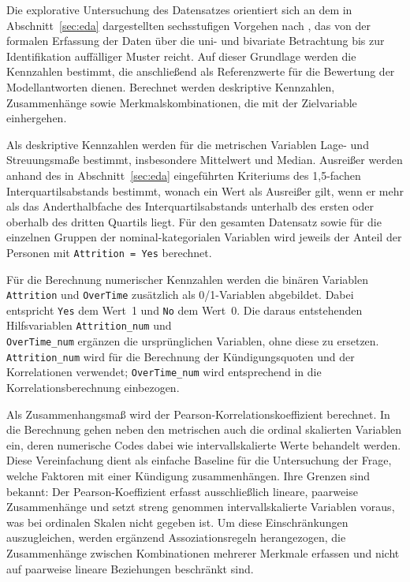 Die explorative Untersuchung des Datensatzes orientiert sich an dem in Abschnitt~\ref{sec:eda} dargestellten sechsstufigen Vorgehen nach \textcite{rahmany_comparing_2020}, das von der formalen Erfassung der Daten über die uni- und bivariate Betrachtung bis zur Identifikation auffälliger Muster reicht. Auf dieser Grundlage werden die Kennzahlen bestimmt, die anschließend als Referenzwerte für die Bewertung der Modellantworten dienen. Berechnet werden deskriptive Kennzahlen, Zusammenhänge sowie Merkmalskombinationen, die mit der Zielvariable einhergehen.

Als deskriptive Kennzahlen werden für die metrischen Variablen Lage- und Streuungsmaße bestimmt, insbesondere Mittelwert und Median. Ausreißer werden anhand des in Abschnitt~\ref{sec:eda} eingeführten Kriteriums des 1,5-fachen Interquartilsabstands bestimmt, wonach ein Wert als Ausreißer gilt, wenn er mehr als das Anderthalbfache des Interquartilsabstands unterhalb des ersten oder oberhalb des dritten Quartils liegt. Für den gesamten Datensatz sowie für die einzelnen Gruppen der nominal-kategorialen Variablen wird jeweils der Anteil der Personen mit \texttt{Attrition = Yes} berechnet.

Für die Berechnung numerischer Kennzahlen werden die binären Variablen \texttt{Attrition} und \texttt{OverTime} zusätzlich als 0/1-Variablen abgebildet. Dabei entspricht \texttt{Yes} dem Wert~1 und \texttt{No} dem Wert~0. Die daraus entstehenden Hilfsvariablen  \texttt{Attrition\_num} und \\ \texttt{OverTime\_num} ergänzen die ursprünglichen Variablen, ohne diese zu ersetzen. \\ \texttt{Attrition\_num} wird für die Berechnung der Kündigungsquoten und der Korrelationen verwendet; \texttt{OverTime\_num} wird entsprechend in die Korrelationsberechnung einbezogen.

Als Zusammenhangsmaß wird der Pearson-\-Korre\-lations\-koeffi\-zient berechnet. In die Berechnung gehen neben den metrischen auch die ordinal skalierten Variablen ein, deren numerische Codes dabei wie intervallskalierte Werte behandelt werden. Diese Vereinfachung dient als einfache Baseline für die Untersuchung der Frage, welche Faktoren mit einer Kündigung zusammenhängen. Ihre Grenzen sind bekannt: Der Pearson-Koeffizient erfasst ausschließlich lineare, paarweise Zusammenhänge und setzt streng genommen intervallskalierte Variablen voraus, was bei ordinalen Skalen nicht gegeben ist. Um diese Einschränkungen auszugleichen, werden ergänzend Assoziationsregeln herangezogen, die Zusammenhänge zwischen Kombinationen mehrerer Merkmale erfassen und nicht auf paarweise lineare Beziehungen beschränkt sind. 

